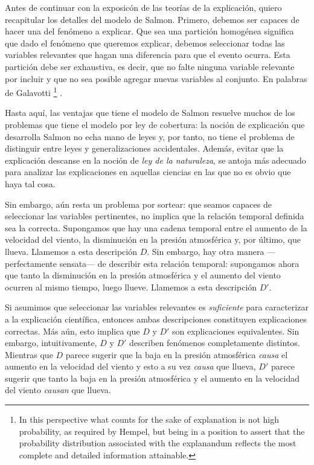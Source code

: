 Antes de continuar con la exposicón de las teorías de la explicación,
quiero recapitular los detalles del modelo de Salmon. Primero,
debemos ser capaces de hacer una  del fenómeno a
explicar. Que sea una partición homogénea significa que dado el fenómeno
que queremos explicar, debemos seleccionar todas las variables relevantes
que hagan una diferencia para que el evento ocurra. Esta partición debe
ser exhaustiva, es decir, que no falte ninguna variable relevante por
incluir y que no sea posible agregar nuevas variables al conjunto. En
palabras de Galavotti \footnote{
	In this perspective what counts	for the sake of explanation is not high
	probability, as required by	Hempel, but being in a position to assert
	that the probability	distribution associated with the explanandum
	reflects the most	complete and detailed information attainable.
}
\parencite{Galavotti2018}.

Hasta aquí, las ventajas que tiene el modelo de Salmon resuelve
muchos de los problemas que tiene el modelo por ley de cobertura: la
noción de explicación que desarrolla Salmon no echa mano de leyes y,
por tanto, no tiene el problema de distinguir entre leyes y
generalizaciones accidentales. Además, evitar que la explicación
descanse en la noción de \emph{ley de la naturaleza}, se antoja más
adecuado para analizar las explicaciones en aquellas ciencias en las
que no es obvio que haya tal cosa.

Sin embargo, aún resta un problema por sortear: que seamos capaces de
seleccionar las variables pertinentes, no implica que la relación temporal
definida sea la correcta. Supongamos que hay una cadena temporal entre el
aumento de la velocidad del viento, la disminución en la presión
atmosférica y, por último, que llueva. Llamemos a esta descripción $ D $.
Sin embargo, hay otra manera ---perfectamente sensata--- de describir esta
relación temporal: supongamos ahora que tanto la disminución en la presión
atmosférica y el aumento del viento ocurren al mismo tiempo, luego
llueve. Llamemos a esta descripción $ D' $.

Si asumimos que seleccionar las variables relevantes es
\emph{suficiente} para caracterizar a la explicación científica,
entonces ambas descripciones constituyen explicaciones correctas. Más
aún, esto implica que $  D  $ y $  D' $ son explicaciones equivalentes. Sin
embargo, intuitivamente, $ D $ y $ D' $ describen fenómenos completamente
distintos. Mientras que $ D $ parece sugerir que la baja en la presión
atmosférica \emph{causa} el aumento en la velocidad del viento y
esto a su vez \emph{causa} que llueva, $ D' $ parece sugerir que tanto
la baja en la presión atmosférica y el aumento en la velocidad del
viento \emph{causan} que llueva.

